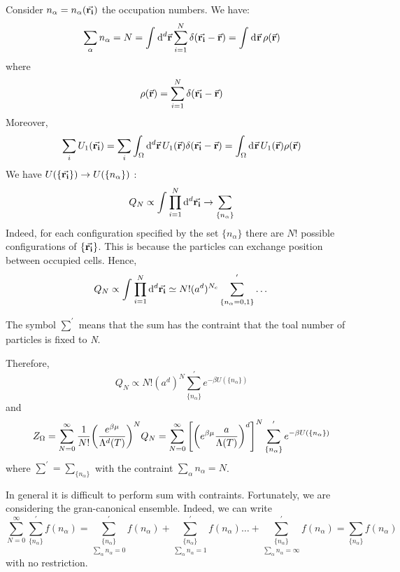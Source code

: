 \documentclass[../main/main.tex]{subfiles}
\begin{document}
Consider \( n_ \alpha = n_ \alpha (\va{r_i}) \) the occupation numbers. We have:
\begin{equation}
  \sum_{\alpha }^{} n_ \alpha = N = \int_{}^{} \dd[d]{\va{r}} \sum_{i=1}^{N} \delta (\va{r_i}-\va{r})= \int_{}^{} \dd[]{\va{r}} \rho (\va{r})
\end{equation}
where
\begin{equation}
  \rho (\va{r}) = \sum_{i=1}^{N}  \delta (\va{r_i}-\va{r})
\end{equation}
Moreover,
\begin{equation}
  \sum_{i}^{} U_1 (\va{r_i}) = \sum_{i}^{} \int_{\Omega }^{} \dd[d]{\va{r}} U_1 (\va{r})   \delta (\va{r_i}-\va{r}) = \int_{\Omega }^{} \dd[]{\va{r}}      U_1 (\va{r}) \rho (\va{r})
\end{equation}
We have \( U (\{ \va{r_i} \}  ) \rightarrow U (\{ n_ \alpha  \}  ) \) :
\begin{equation}
  Q_N \propto \int_{}^{} \prod_{i=1}^{N}  \dd[d]{\va{r_i}}   \rightarrow \sum_{\{ n_ \alpha  \} }^{}
\end{equation}
Indeed, for each configuration specified by the set \( \{ n_ \alpha  \}  \) there are \( N! \) possible configurations of \( \{ \va{r_i} \}  \). This is because the particles can exchange position between occupied cells.
Hence,
\begin{equation}
 Q_N \propto \int_{}^{} \prod_{i=1}^{N}  \dd[d]{\va{r_i}} \simeq N! (a^d)^{N_c} \sum_{\{ n_ \alpha = 0, 1 \}}^{'} \dots
\end{equation}
\begin{remark}
The symbol \( \sum_{}^{'}   \) means that the sum has the contraint that the toal number of particles is fixed to \emph{N}.
\end{remark}
Therefore,
\begin{equation}
  Q_N \propto N! (a^d)^N \sum_{\{ n_ \alpha  \} }^{'} e^{-\beta U ( \{ n_ \alpha  \} )}
\end{equation}
and
\begin{equation}
  Z_ \Omega  = \sum_{N=0}^{\infty } \frac{1}{N!} \qty(\frac{e^{\beta \mu } }{\Lambda ^d (T)}) ^N Q_N = \sum_{N=0}^{\infty } \qty[\qty(e^{\beta \mu} \frac{a}{\Lambda (T)}  )^d ]  ^N \sum_{\{ n_ \alpha  \} }^{'} e^{-\beta U ( \{ n_ \alpha  \} )}
\end{equation}
where \( \sum_{}^{'} = \sum_{\{ n_ \alpha  \} }^{}     \)  with the contraint \( \sum_{\alpha }^{} n_ \alpha = N   \).
\begin{remark}
In general it is difficult to perform sum with contraints. Fortunately, we are considering the gran-canonical ensemble.
Indeed, we can write
\begin{equation}
  \sum_{N=0}^{\infty} \sum_{\{ n_ \alpha  \}}^{'} f(n_ \alpha ) =   \underset{\sum_{\alpha }^{} n_ \alpha =0 }{\sum_{\{ n_ \alpha  \} }^{'}} f (n_ \alpha )  +
  \underset{\sum_{\alpha }^{} n_ \alpha =1 }{\sum_{\{ n_ \alpha  \} }^{'}} f (n_ \alpha )
  \dots +
    \underset{\sum_{\alpha }^{} n_ \alpha = \infty }{\sum_{\{ n_ \alpha  \} }^{'}} f (n_ \alpha ) =  \sum_{\{ n_ \alpha  \}} f(n_ \alpha )
\end{equation}
with no restriction.
\end{remark}
\end{document}
